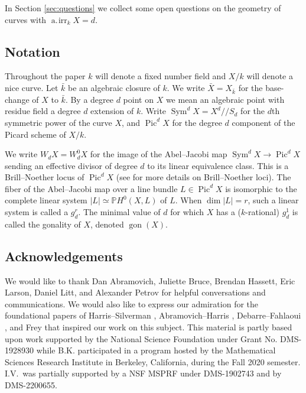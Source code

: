 \documentclass[11pt]{amsart}
\newcommand{\defi}[1]{\textsf{#1}}
\newcommand{\pp}{\mathbb{P}}
\DeclareMathOperator{\Pic}{Pic}
\DeclareMathOperator{\Sym}{Sym}
\newcommand{\airr}{\operatorname{a.\!irr}}
\newcommand{\gon}{\operatorname{gon}}
\theoremstyle{definition}
\theoremstyle{remark}
\begin{document}
In Section \ref{sec:questions} we collect some open questions on the geometry of curves with $\airr_k X = d$.



\subsection{Notation}

Throughout the paper $k$ will denote a fixed number field and $X/k$ will denote a nice curve.  Let \(\bar{k}\) be an algebraic closure of \(k\).  We write \(\bar{X} = X_{\bar{k}}\) for the base-change of \(X\) to \(\bar{k}\).  By a \defi{degree \(d\)} point on \(X\) we mean an algebraic point with residue field a degree \(d\) extension of \(k\).  Write \(\Sym^dX = X^d/\!\!/S_d\) for the \(d\)th symmetric power of the curve \(X\), and \(\Pic^dX\) for the degree \(d\) component of the Picard scheme of \(X/k\). 

We write \(W_dX = W^0_dX\) for the image of the Abel--Jacobi map \(\Sym^dX \to \Pic^dX\) sending an effective divisor of degree \(d\) to its linear equivalence class.  This is a Brill--Noether locus of \(\Pic^dX\) (see \cite[Chapter IV \(\S\)3]{ACGH} for more details on Brill--Noether loci). The fiber of the Abel--Jacobi map over a line bundle \(L \in \Pic^d X\) is isomorphic to the \defi{complete linear system} \(|L| \simeq \pp H^0(X, L)\) of \(L\).  When \(\dim |L| = r\), such a linear system is called a \defi{\(g^r_d\)}.  The minimal value of \(d\) for which \(X\) has a (\(k\)-rational) \(g^1_d\) is called the \defi{gonality} of \(X\), denoted \(\gon(X)\).

\subsection*{Acknowledgements}
We would like to thank Dan Abramovich, Juliette Bruce, Brendan Hassett, Eric Larson, Daniel Litt, and Alexander Petrov for helpful conversations and communications.
We would also like to express our admiration for the foundational papers of Harris--Silverman \cite{Harris-Silverman1991}, Abramovich--Harris \cite{Abramovich-Harris1991}, Debarre--Fahlaoui \cite{Debarre-Fahlaoui1993}, and Frey \cite{frey1994} that inspired our work on this subject.
This material is partly based upon work supported by the National Science Foundation under Grant No. DMS-1928930 while B.K. participated in a program hosted by the Mathematical Sciences Research Institute in Berkeley, California, during the Fall 2020 semester.  I.V.~was partially supported by a NSF MSPRF under DMS-1902743 and by DMS-2200655.
\end{document}
